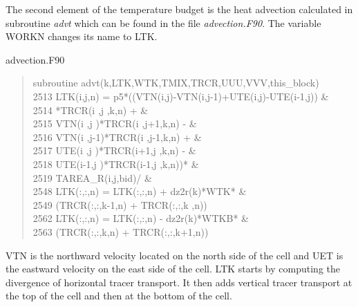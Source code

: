 \begin{appendices}
The second element of the temperature budget is the heat advection calculated in subroutine \textit{advt} which can be found in the file \textit{advection.F90}. The variable WORKN changes its name to LTK. 
\begin{samepage}
\begin{center} advection.F90 \end{center}
\begin{quotation}
\small
\linespread{0.5}\selectfont{} \hspace{1em} subroutine advt(k,LTK,WTK,TMIX,TRCR,UUU,VVV,this\_block)\\
2513 	\hspace{1em} LTK(i,j,n) = p5*((VTN(i,j)-VTN(i,j-1)+UTE(i,j)-UTE(i-1,j))  \&\\
2514 	\hspace{1em} *TRCR(i  ,j  ,k,n) +           \&\\
2515 	\hspace{1em} VTN(i  ,j  )*TRCR(i  ,j+1,k,n) -           \&\\
2516 	\hspace{1em} VTN(i  ,j-1)*TRCR(i  ,j-1,k,n) +           \&\\
2517 	\hspace{1em} UTE(i  ,j  )*TRCR(i+1,j  ,k,n) -           \&\\
2518 	\hspace{1em} UTE(i-1,j  )*TRCR(i-1,j  ,k,n))*           \&\\
2519 	\hspace{1em} TAREA\_R(i,j,bid)/ \& \\
2548 	\hspace{1em} LTK(:,:,n) = LTK(:,:,n) + dz2r(k)*WTK*  \&\\
2549 	\hspace{1em}  (TRCR(:,:,k-1,n) + TRCR(:,:,k  ,n))\\
2562		\hspace{1em}          LTK(:,:,n) = LTK(:,:,n) - dz2r(k)*WTKB* \&\\
2563 	\hspace{1em}                         (TRCR(:,:,k,n) + TRCR(:,:,k+1,n))
\end{quotation}
\end{samepage}
VTN is the northward velocity located on the north side of the cell and UET is the eastward velocity on the east side of the cell. LTK starts by computing the divergence of horizontal tracer transport. It then adds vertical tracer transport at the top of the cell and then at the bottom of the cell. 


\end{appendices}
